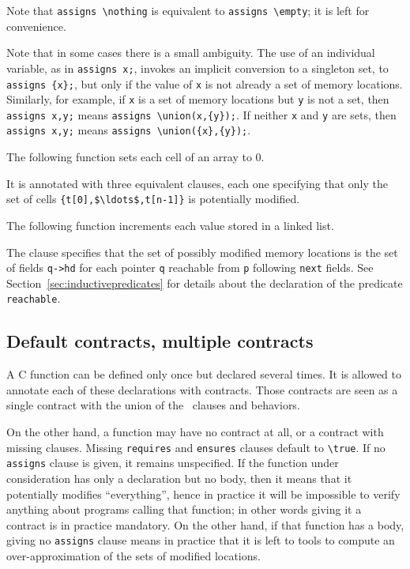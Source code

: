 Note that \lstinline|assigns \nothing| is equivalent to
\lstinline|assigns \empty|; it is left for convenience.

Note that in some cases there is a small ambiguity. The
use of an
individual variable, as in \lstinline|assigns x;|, invokes an implicit conversion to a singleton set, to
\lstinline|assigns {x};|, but only if the value of \lstinline|x| is not already a set of memory locations.
Similarly, for example, if \lstinline|x| is a set of memory locations but \lstinline|y| is not a set, then \lstinline|assigns x,y;| means
\lstinline|assigns \union(x,{y});|. If neither \lstinline|x| and \lstinline|y| are sets, then \lstinline|assigns x,y;| means
\lstinline|assigns \union({x},{y});|.

\begin{example}
  The following function sets each cell of an array to 0.

%
  It is annotated with three equivalent \assigns{} clauses, each one
  specifying that only the set of cells
  \lstinline|{t[0],$\ldots$,t[n-1]}|
  is potentially modified.
\end{example}

\begin{example}
  \label{ex:locations-list}
  The following function increments each value stored in a linked
  list.

%
  The \assigns{} clause specifies that the set of possibly modified memory
  locations is the set of fields \lstinline|q->hd| for each pointer
  \lstinline|q|
  reachable from \lstinline|p| following \lstinline|next| fields. See
  Section~\ref{sec:inductivepredicates} for details about the
  declaration of the predicate \texttt{reachable}.
\end{example}

\subsection{Default contracts, multiple contracts}
\label{sec:multiplecontracts}

A C function can be defined only once but declared several times.
It is allowed to annotate each of these declarations with contracts.
Those contracts are seen as a single contract with the union of the
\requires\ clauses and behaviors.

On the other hand, a function may have no contract at all, or a
contract with missing clauses. Missing \lstinline|requires| and
\lstinline|ensures| clauses default to \lstinline!\true!.
If no \lstinline|assigns| clause is given, it remains unspecified. If the
function under consideration has only a declaration but no body, then
it means that it potentially modifies ``everything'', hence in practice
it will be impossible to verify anything about programs calling that
function; in other words giving it a contract is in practice
mandatory. On the other hand, if that function has a body, giving no
\lstinline|assigns| clause means in practice that it is left to tools to
compute an over-approximation of the sets of modified locations.

